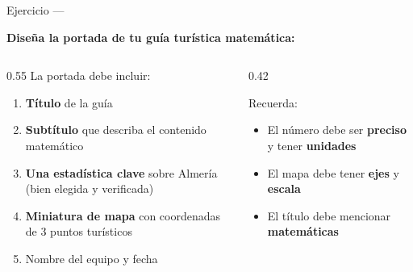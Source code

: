 \documentclass[aspectratio=169, 10pt, spanish]{beamer}
\begin{document}
\begin{frame}{Ejercicio — }
  \begin{crearbox}
    \textbf{Diseña la portada de tu guía turística matemática:}

    \vspace{0.3cm}
    \begin{columns}[t]
      \begin{column}{0.55\textwidth}
        La portada debe incluir:
        \begin{enumerate}
          \item \textbf{Título} de la guía
          \item \textbf{Subtítulo} que describa el contenido matemático
          \item \textbf{Una estadística clave} sobre Almería (bien elegida y verificada)
          \item \textbf{Miniatura de mapa} con coordenadas de 3 puntos turísticos
          \item Nombre del equipo y fecha
        \end{enumerate}
      \end{column}
      \begin{column}{0.42\textwidth}
        \begin{notabox}[Diseño]
          Recuerda:
          \begin{itemize}
            \item El número debe ser \textbf{preciso} y tener \textbf{unidades}
            \item El mapa debe tener \textbf{ejes} y \textbf{escala}
            \item El título debe mencionar \textbf{matemáticas}
          \end{itemize}
        \end{notabox}
      \end{column}
    \end{columns}
  \end{crearbox}
\end{frame}
\end{document}
